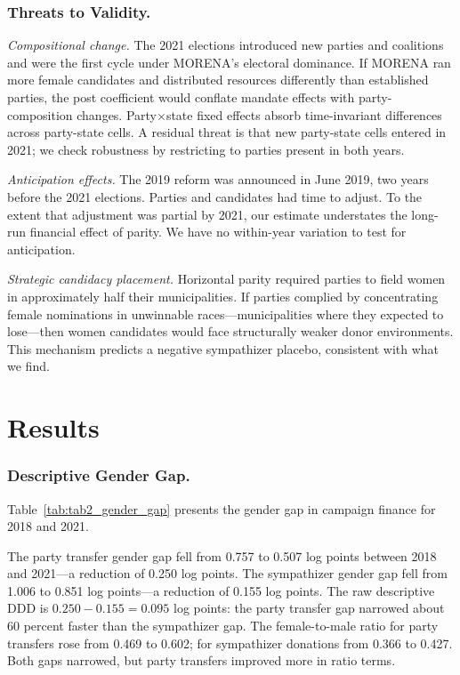 \documentclass[12pt]{article}
\begin{document}
\subsubsection*{Threats to Validity.}
\emph{Compositional change.} The 2021 elections introduced new parties and coalitions and were the first cycle under MORENA's electoral dominance. If MORENA ran more female candidates and distributed resources differently than established parties, the post coefficient would conflate mandate effects with party-composition changes. Party$\times$state fixed effects absorb time-invariant differences across party-state cells. A residual threat is that new party-state cells entered in 2021; we check robustness by restricting to parties present in both years.

\emph{Anticipation effects.} The 2019 reform was announced in June 2019, two years before the 2021 elections. Parties and candidates had time to adjust. To the extent that adjustment was partial by 2021, our estimate understates the long-run financial effect of parity. We have no within-year variation to test for anticipation.

\emph{Strategic candidacy placement.} Horizontal parity required parties to field women in approximately half their municipalities. If parties complied by concentrating female nominations in unwinnable races---municipalities where they expected to lose---then women candidates would face structurally weaker donor environments. This mechanism predicts a negative sympathizer placebo, consistent with what we find.

\section{Results}
\label{sec:results}

\subsubsection*{Descriptive Gender Gap.}
Table~\ref{tab:tab2_gender_gap} presents the gender gap in campaign finance for 2018 and 2021.



The party transfer gender gap fell from 0.757 to 0.507 log points between 2018 and 2021---a reduction of 0.250 log points. The sympathizer gender gap fell from 1.006 to 0.851 log points---a reduction of 0.155 log points. The raw descriptive DDD is $0.250 - 0.155 = 0.095$ log points: the party transfer gap narrowed about 60 percent faster than the sympathizer gap. The female-to-male ratio for party transfers rose from 0.469 to 0.602; for sympathizer donations from 0.366 to 0.427. Both gaps narrowed, but party transfers improved more in ratio terms.
\end{document}
